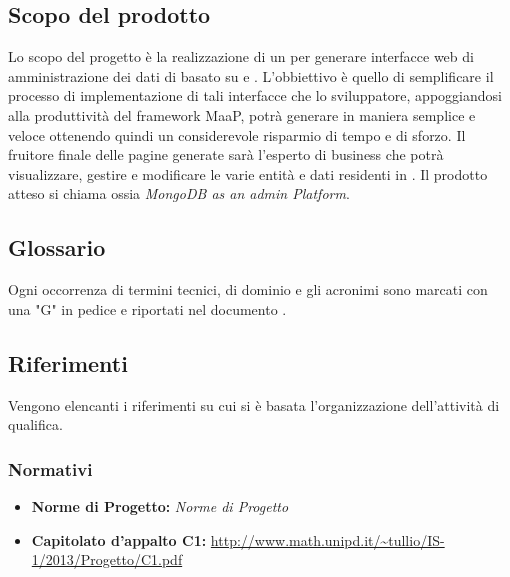 \subsection{Scopo del prodotto}
Lo scopo del progetto è la realizzazione di un  per generare interfacce web di amministrazione dei dati di  basato su   e . L'obbiettivo è quello di semplificare il processo di implementazione di tali interfacce che lo sviluppatore, appoggiandosi alla produttività del framework MaaP, potrà generare in maniera semplice e veloce ottenendo quindi un considerevole risparmio di tempo e di sforzo. Il fruitore finale delle pagine generate sarà l'esperto di business che potrà visualizzare, gestire e modificare le varie entità e dati residenti in .
Il prodotto atteso si chiama  ossia \emph{MongoDB as an admin Platform}. 

\subsection{Glossario}
Ogni occorrenza di termini tecnici, di dominio e gli acronimi sono marcati con una "G" in pedice e riportati nel documento \Glossario{}.

\subsection{Riferimenti}
Vengono elencanti i riferimenti su cui si è basata l'organizzazione dell'attività di qualifica.
	\subsubsection{Normativi}
		\begin{itemize}
  			\item \textbf{Norme di Progetto:}  \emph{Norme di Progetto}
			\item \textbf{Capitolato d'appalto C1:} \url{http://www.math.unipd.it/~tullio/IS-1/2013/Progetto/C1.pdf}
		\end{itemize}
